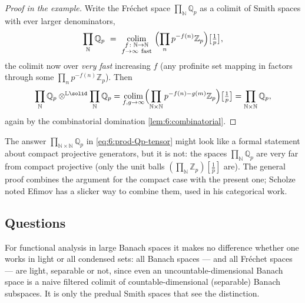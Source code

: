 \begin{proof}[Proof in the example]
Write the Fréchet space $\prod_{\mathbb{N}}\mathbb{Q}_p$ as a colimit of Smith
spaces with ever larger denominators,
\begin{equation*}
\prod_{\mathbb{N}}\mathbb{Q}_p\ =\
\operatorname*{colim}_{\substack{f\colon\mathbb{N}\to\mathbb{N}\\ f\to\infty\ \text{fast}}}\
\Bigl(\prod_{n}p^{-f(n)}\mathbb{Z}_p\Bigr)\bigl[\tfrac1p\bigr] ,
\end{equation*}
the colimit now over \emph{very fast} increasing $f$ (any profinite set mapping
in factors through some $\prod_n p^{-f(n)}\mathbb{Z}_p$). Then
\begin{equation*}
\prod_{\mathbb{N}}\mathbb{Q}_p\otimes^{\mathbb{L}\solid}\prod_{\mathbb{N}}\mathbb{Q}_p
=\operatorname*{colim}_{f,g\to\infty}\Bigl(\prod_{\mathbb{N}\times\mathbb{N}}
p^{-f(n)-g(m)}\mathbb{Z}_p\Bigr)\bigl[\tfrac1p\bigr]
=\prod_{\mathbb{N}\times\mathbb{N}}\mathbb{Q}_p,
\end{equation*}
again by the combinatorial domination \cref{lem:6:combinatorial}.
\end{proof}

\begin{remark}
\label{rmk:6:huge-not-compact}
The answer $\prod_{\mathbb{N}\times\mathbb{N}}\mathbb{Q}_p$ in
\eqref{eq:6:prod-Qp-tensor} might look like a formal statement about compact
projective generators, but it is not: the spaces $\prod_{\mathbb{N}}\mathbb{Q}_p$
are very far from compact projective (only the unit balls
$(\prod_{\mathbb{N}}\mathbb{Z}_p)[\tfrac1p]$ are). The general proof combines the
argument for the compact case with the present one; Scholze noted Efimov has a
slicker way to combine them, used in his categorical work.
\end{remark}

\subsection{Questions}

\begin{remark}
\label{rmk:6:light-banach}
For functional analysis in large Banach spaces it makes no difference whether one
works in light or all condensed sets: all Banach spaces --- and all Fréchet
spaces --- are light, separable or not, since even an uncountable-dimensional
Banach space is a naive filtered colimit of countable-dimensional (separable)
Banach subspaces. It is only the predual Smith spaces that see the distinction.
\end{remark}

